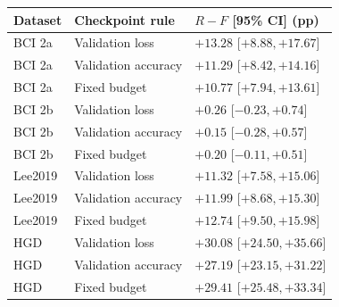 \begin{tabular}{@{}lll@{}}
\toprule
Dataset & Checkpoint rule & $R-F$ [95\% CI] (pp) \\
\midrule
BCI 2a & Validation loss & $+13.28$ [$ +8.88, +17.67 $] \\
BCI 2a & Validation accuracy & $+11.29$ [$ +8.42, +14.16 $] \\
BCI 2a & Fixed budget & $+10.77$ [$ +7.94, +13.61 $] \\
BCI 2b & Validation loss & $+0.26$ [$ -0.23, +0.74 $] \\
BCI 2b & Validation accuracy & $+0.15$ [$ -0.28, +0.57 $] \\
BCI 2b & Fixed budget & $+0.20$ [$ -0.11, +0.51 $] \\
Lee2019 & Validation loss & $+11.32$ [$ +7.58, +15.06 $] \\
Lee2019 & Validation accuracy & $+11.99$ [$ +8.68, +15.30 $] \\
Lee2019 & Fixed budget & $+12.74$ [$ +9.50, +15.98 $] \\
HGD & Validation loss & $+30.08$ [$ +24.50, +35.66 $] \\
HGD & Validation accuracy & $+27.19$ [$ +23.15, +31.22 $] \\
HGD & Fixed budget & $+29.41$ [$ +25.48, +33.34 $] \\
\bottomrule
\end{tabular}
